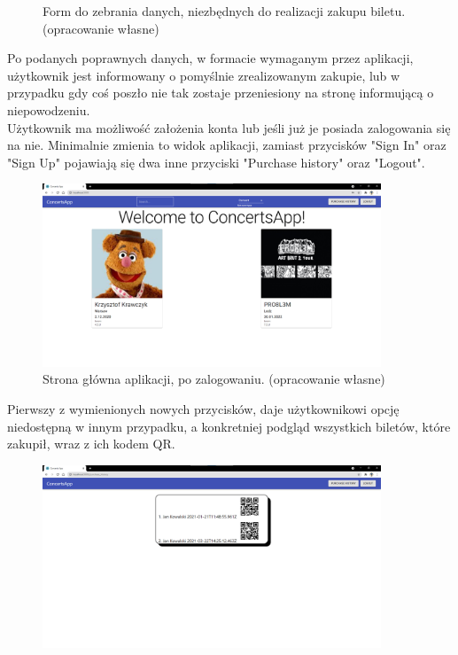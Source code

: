 \documentclass[12pt]{article}
\begin{document}
\begin{sloppypar}
{\begin{figure}[H]
    \caption{Form do zebrania danych, niezbędnych do realizacji zakupu biletu. (opracowanie własne)}
    \label{fig:payment-guest}
  \end{figure}
  Po podanych poprawnych danych, w formacie wymaganym przez aplikacji, użytkownik jest informowany o pomyślnie zrealizowanym zakupie, lub w przypadku gdy coś poszło 
  nie tak zostaje przeniesiony na stronę informującą o niepowodzeniu.\\
  Użytkownik ma możliwość założenia konta lub jeśli już je posiada zalogowania się na nie. 
  Minimalnie zmienia to widok aplikacji, zamiast przycisków "Sign In" oraz "Sign Up" pojawiają się dwa inne przyciski "Purchase history" oraz "Logout".
  \begin{figure}[H]
    \centering
    \includegraphics[width=0.9\textwidth]{client_app/logged_in.png}
    \caption{Strona główna aplikacji, po zalogowaniu. (opracowanie własne)}
    \label{fig:signed-in}
  \end{figure}
  Pierwszy z wymienionych nowych przycisków, daje użytkownikowi opcję niedostępną w innym przypadku, a konkretniej podgląd wszystkich biletów, które zakupił, wraz z ich kodem QR.
  \begin{figure}[H]
    \centering
    \includegraphics[width=0.9\textwidth]{client_app/purchase_history.png}

\end{figure}}
\end{sloppypar}
\end{document}
